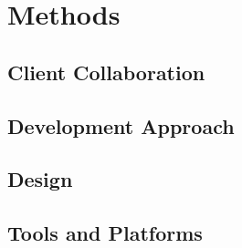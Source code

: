 \chapter{Methods}

\section{Client Collaboration}

\section{Development Approach}




\section{Design}


\section{Tools and Platforms}




